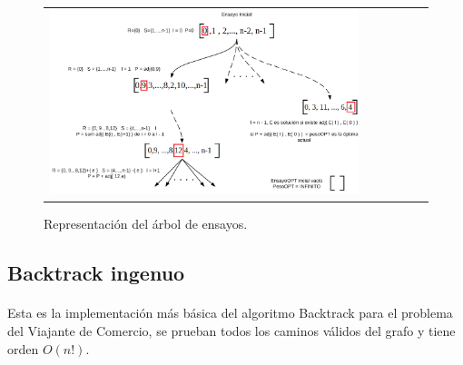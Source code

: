 \documentclass[es]{ifirak}
\begin{document}
{	\begin{figure}[htbp]
		\begin{tabular}{lccccc}                                                            
			\includegraphics[width=1\textwidth]{Arbol_ensayos_Backtrack.png}& \hspace*{ 4cm}&   &   &   &                                       
		\end{tabular}
		\caption{Representación del árbol de ensayos.}\label{figure}
	\end{figure}
	
	
	\pagebreak
	\subsection{Backtrack ingenuo}
	\paragraph{}
	Esta es la implementación más básica del algoritmo Backtrack para el problema del Viajante de Comercio, se prueban todos los caminos válidos del grafo y tiene orden $O(n!)$.\\
	
}
\end{document}
